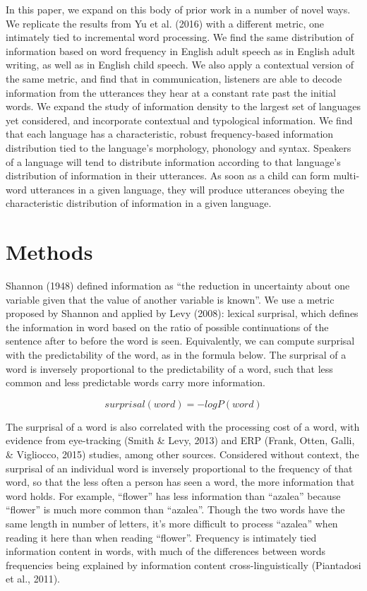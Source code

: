 \documentclass[11pt,]{article}
\begin{document}
In this paper, we expand on this body of prior work in a number of novel ways. We replicate the results from Yu et al. (2016) with a different metric, one intimately tied to incremental word processing. We find the same distribution of information based on word frequency in English adult speech as in English adult writing, as well as in English child speech. We also apply a contextual version of the same metric, and find that in communication, listeners are able to decode information from the utterances they hear at a constant rate past the initial words. We expand the study of information density to the largest set of languages yet considered, and incorporate contextual and typological information. We find that each language has a characteristic, robust frequency-based information distribution tied to the language's morphology, phonology and syntax. Speakers of a language will tend to distribute information according to that language's distribution of information in their utterances. As soon as a child can form multi-word utterances in a given language, they will produce utterances obeying the characteristic distribution of information in a given language.

\hypertarget{methods}{%
\section{Methods}\label{methods}}

Shannon (1948) defined information as ``the reduction in uncertainty about one variable given that the value of another variable is known''. We use a metric proposed by Shannon and applied by Levy (2008): lexical surprisal, which defines the information in word based on the ratio of possible continuations of the sentence after to before the word is seen. Equivalently, we can compute surprisal with the predictability of the word, as in the formula below. The surprisal of a word is inversely proportional to the predictability of a word, such that less common and less predictable words carry more information.

\[surprisal(word) = -log P(word)\]

The surprisal of a word is also correlated with the processing cost of a word, with evidence from eye-tracking (Smith \& Levy, 2013) and ERP (Frank, Otten, Galli, \& Vigliocco, 2015) studies, among other sources. Considered without context, the surprisal of an individual word is inversely proportional to the frequency of that word, so that the less often a person has seen a word, the more information that word holds. For example, ``flower'' has less information than ``azalea'' because ``flower'' is much more common than ``azalea''. Though the two words have the same length in number of letters, it's more difficult to process ``azalea'' when reading it here than when reading ``flower''. Frequency is intimately tied information content in words, with much of the differences between words frequencies being explained by information content cross-linguistically (Piantadosi et al., 2011).
\end{document}
